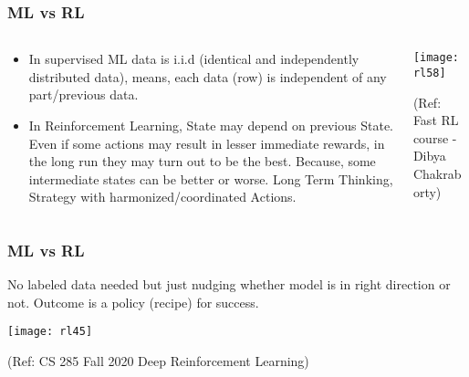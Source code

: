 \begin{frame}[fragile]\frametitle{ML vs RL}

\begin{columns}
\begin{column}{0.5\textwidth}

\begin{itemize}
\item In supervised ML data is i.i.d (identical and independently distributed data), means, each data (row) is independent of any part/previous data. 
\item In Reinforcement Learning, State may depend on previous State. Even if some actions may result in lesser immediate rewards, in the long run they may turn out to be the best. Because, some intermediate states can be better or worse. Long Term Thinking, Strategy with harmonized/coordinated Actions.
\end{itemize}

\end{column}
\begin{column}{0.5\textwidth}  %


\begin{center}
\texttt{[image: rl58]}

{\tiny (Ref: Fast RL course - Dibya Chakraborty)}

\end{center}
\end{column}
\end{columns}

\end{frame}


\begin{frame}[fragile]\frametitle{ML vs RL}

No labeled data needed but just nudging whether model is in right direction or not. Outcome is a policy (recipe) for success.

\begin{center}
\texttt{[image: rl45]}
\end{center}

{\tiny (Ref: CS 285 Fall 2020 Deep Reinforcement Learning)}

\end{frame}

